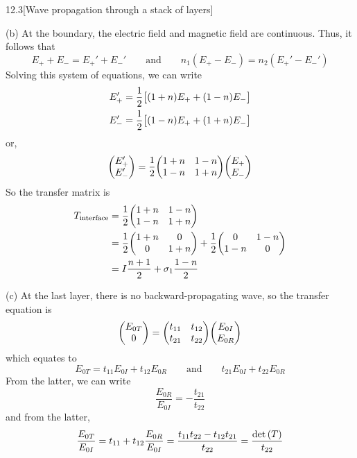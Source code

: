 \documentclass[12pt]{article}
\begin{document}
\begin{problem}{12.3}[Wave propagation through a stack of layers]
\begin{solution}
(b) At the boundary, the electric field and magnetic field are continuous. Thus,
it follows that
\begin{equation}
    E_++E_-=E_+'+E_-' 
    \qquad\text{and}\qquad
    n_1(E_+-E_-)=n_2(E_+'-E_-')
\end{equation}
Solving this system of equations, we can write
\begin{subequations}
   \begin{align}
       E_+'&=\frac12\qty[(1+n)E_++(1-n)E_-]\\
       E_-'&=\frac12\qty[(1-n)E_++(1+n)E_-]
   \end{align} 
\end{subequations}
or,
\begin{equation}
    \mqty(E_+'\\E_-')=\frac12\mqty(1+n&1-n\\1-n&1+n)\mqty(E_+\\E_-)
\end{equation}
So the transfer matrix is
\begin{align}
    T_\text{interface}
    &=\frac12\mqty(1+n&1-n\\1-n&1+n)\notag\\
    &=\frac12\mqty(1+n&0\\0&1+n)+\frac12\mqty(0&1-n\\1-n&0)\notag\\
    &=I\frac{n+1}{2}+\sigma_1\frac{1-n}{2}
\end{align}

(c) At the last layer, there is no backward-propagating wave, so the transfer
equation is
\begin{equation}
    \mqty(E_{0T}\\0)=\mqty(t_{11}&t_{12}\\t_{21}&t_{22})\mqty(E_{0I}\\E_{0R}) 
\end{equation}
which equates to
\begin{equation}
    E_{0T}=t_{11}E_{0I}+t_{12}E_{0R} 
    \qquad\text{and}\qquad
    t_{21}E_{0I}+t_{22}E_{0R}
\end{equation}
From the latter, we can write
\begin{equation}
    \frac{E_{0R}}{E_{0I}}=-\frac{t_{21}}{t_{22}} 
\end{equation}
and from the latter,
\begin{equation}
    \frac{E_{0T}}{E_{0I}}=t_{11}+t_{12}\frac{E_{0R}}{E_{0I}} 
    =\frac{t_{11}t_{22}-t_{12}t_{21}}{t_{22}}
    =\frac{\det\qty(T)}{t_{22}}
\end{equation}
\end{solution}
\end{problem}
\end{document}
